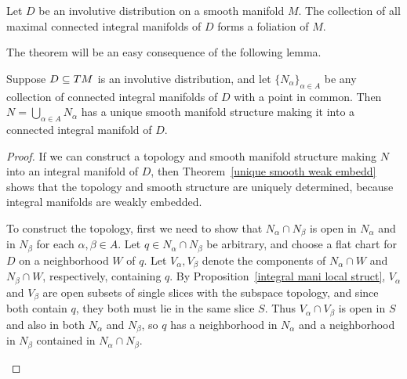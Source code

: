 \begin{theorem}
Let $D$ be an involutive distribution on a smooth manifold $M$. The collection of all maximal connected integral manifolds of $D$ forms a foliation of $M$.
\end{theorem}
The theorem will be an easy consequence of the following lemma.
\begin{lemma}
Suppose $D\subseteq TM$ is an involutive distribution, and let $\{N_\alpha\}_{\alpha\in A}$ be any collection of connected integral manifolds of $D$ with a point in common. Then $N=\bigcup_{\alpha\in A}N_\alpha$ has a unique smooth manifold structure making it into a connected integral manifold of $D$.
\end{lemma}
\begin{proof}
If we can construct a topology and smooth manifold structure making $N$ into an integral manifold of $D$, then Theorem~\ref{unique smooth weak embedd} shows that the topology and smooth structure are uniquely determined, because integral manifolds are weakly embedded.\par
To construct the topology, first we need to show that $N_\alpha\cap N_\beta$ is open in $N_\alpha$ and in $N_\beta$ for each $\alpha,\beta\in A$. Let $q\in N_\alpha\cap N_\beta$ be arbitrary, and choose a flat chart for $D$ on a neighborhood $W$ of $q$. Let $V_\alpha,V_\beta$ denote the components of $N_\alpha\cap W$ and $N_\beta\cap W$, respectively, containing $q$. By Proposition~\ref{integral mani local struct}, $V_\alpha$ and $V_\beta$ are open subsets of single slices with the subspace topology, and since both contain $q$, they both must lie in the same slice $S$. Thus $V_\alpha\cap V_\beta$ is open in $S$ and also in both $N_\alpha$ and $N_\beta$, so $q$ has a neighborhood in $N_\alpha$ and a neighborhood in $N_\beta$ contained in $N_\alpha\cap N_\beta$.
\begin{figure}[htbp]
\centering

\end{figure}
\end{proof}
